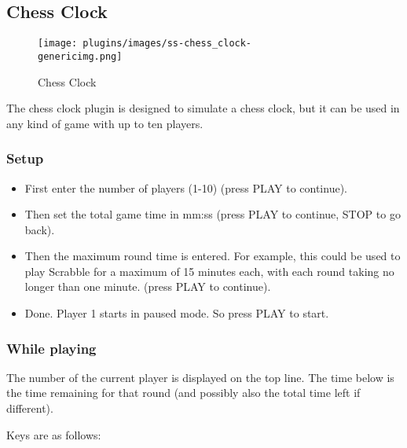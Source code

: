 \subsection{Chess Clock}
\begin{figure}[h!]
\begin{center}
\texttt{[image: plugins/images/ss-chess\_clock-\\genericimg.png]}
\end{center}
\caption{Chess Clock}
\end{figure}

The chess clock plugin is designed  to
simulate a chess clock, but it can be used
in any kind of game with up to ten players.

\subsubsection{Setup}

\begin{itemize}
\item First enter the number of players (1{}-10) (press  PLAY to
continue). 
\item Then set the total game time in mm:ss (press PLAY to continue,
STOP to go back). 
\item Then the maximum round time is entered.  For example, this could
be used  to play Scrabble for a maximum of 15 minutes each, with each
round taking no longer than one minute. (press  PLAY to continue). 
\item Done. Player 1 starts in paused mode. So press PLAY to start.
\end{itemize}

\subsubsection{While playing}
The number of the current player is displayed on the top line. The time
below is the time remaining for that round (and possibly also the total
time left if different). 

Keys are as follows:

